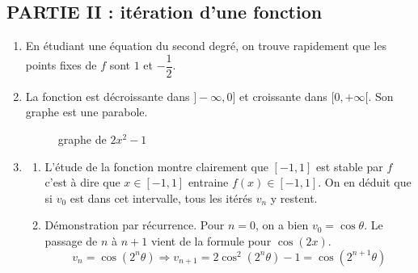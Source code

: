 \subsection*{PARTIE II : itération d'une fonction}
\begin{enumerate}
 \item En étudiant une équation du second degré, on trouve rapidement que les points fixes de $f$ sont $1$ et $-\dfrac{1}{2}$.
 \item La fonction est décroissante dans $]-\infty,0]$ et croissante dans $[0,+\infty[$. Son graphe est une parabole.
\begin{figure}[ht]
 \centering

\label{fig:Cbincos_2}
\caption{graphe de $2x^2-1$}
\end{figure}
 
 \item
\begin{enumerate}
 \item L'étude de la fonction montre clairement que $[-1,1]$ est stable par $f$ c'est à dire que $x\in[-1,1]$ entraine $f(x)\in[-1,1]$. On en déduit que si $v_0$ est dans cet intervalle, tous les itérés $v_n$ y restent.
 \item Démonstration par récurrence. Pour $n=0$, on a bien $v_0 = \cos \theta$. Le passage de $n$ à $n+1$ vient de la formule pour $\cos(2x)$.
\begin{displaymath}
 v_n = \cos(2^n\theta)\Rightarrow 
v_{n+1}= 2 \cos^2(2^n\theta)-1 = \cos(2^{n+1}\theta)
\end{displaymath}
\end{enumerate}

\end{enumerate}

